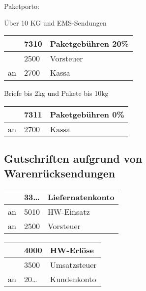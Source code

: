 \documentclass[letterpaper,10pt,english]{sphinxmanual}
\begin{document}
Paketporto:

Über 10 KG und EMS-Sendungen


\begin{savenotes}\sphinxattablestart
\centering
\begin{tabulary}{\linewidth}[t]{|T|T|T|}
\hline
&
7310
&
Paketgebühren 20\%
\\
\hline&
2500
&
Vorsteuer
\\
\hline
an
&
2700
&
Kassa
\\
\hline
\end{tabulary}
\par
\sphinxattableend\end{savenotes}

\begin{DUlineblock}{0em}
\item[] Briefe bis 2kg und Pakete bis 10kg
\end{DUlineblock}


\begin{savenotes}\sphinxattablestart
\centering
\begin{tabulary}{\linewidth}[t]{|T|T|T|}
\hline
&
7311
&
Paketgebühren 0\%
\\
\hline
an
&
2700
&
Kassa
\\
\hline
\end{tabulary}
\par
\sphinxattableend\end{savenotes}


\subsection{Gutschriften aufgrund von Warenrücksendungen}
\label{\detokenize{pool1:gutschriften-aufgrund-von-warenrucksendungen}}


\begin{savenotes}\sphinxattablestart
\centering
\begin{tabulary}{\linewidth}[t]{|T|T|T|}
\hline
&
33…
&
Liefernatenkonto
\\
\hline
an
&
5010
&
HW-Einsatz
\\
\hline
an
&
2500
&
Vorsteuer
\\
\hline
\end{tabulary}
\par
\sphinxattableend\end{savenotes}



\begin{savenotes}\sphinxattablestart
\centering
\begin{tabulary}{\linewidth}[t]{|T|T|T|}
\hline
&
4000
&
HW-Erlöse
\\
\hline&
3500
&
Umsatzsteuer
\\
\hline
an
&
20…
&
Kundenkonto
\\
\hline
\end{tabulary}
\par
\sphinxattableend\end{savenotes}
\end{document}
